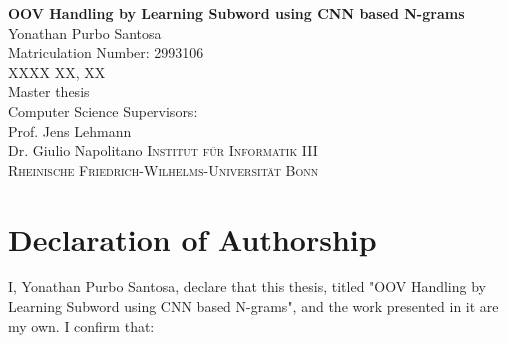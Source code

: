 \documentclass[a4paper,12pt]{report}
\begin{document}




\thispagestyle{empty}
\vskip40mm
\begin{center}
\huge\textbf{OOV Handling by Learning Subword using CNN based N-grams}\\
\vskip 1.5cm
\large Yonathan Purbo Santosa\\
Matriculation Number: 2993106\\
XXXX XX, XX\\
\vskip 1.5cm
Master thesis\\
Computer Science
\vskip 1.5cm
Supervisors:\\
Prof. Jens Lehmann\\
Dr. Giulio Napolitano
\vfill
\textsc{Institut f{\"u}r Informatik III}\\
\textsc{Rheinische Friedrich-Wilhelms-Universit{\"a}t Bonn}
\end{center}

\newpage
\thispagestyle{empty}
\mbox{}

\chapter*{Declaration of Authorship}
I, Yonathan Purbo Santosa, declare that this thesis, titled "OOV Handling by
Learning Subword using CNN based N-grams", and the work presented in
it are my own. I confirm that:
\end{document}
